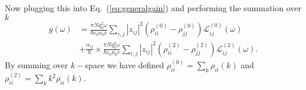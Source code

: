 \documentclass[preprint,secnumarabic,amssymb, nobibnotes, aip, prd]{revtex4-1}
\begin{document}
Now plugging this into Eq.~(\ref{eq:generalgain}) and performing the summation over $k$
\begin{align}
g(\omega) &= \frac{\pi Nq_0^2\omega}{\hbar\epsilon_0n_0c}\sum_{i,j}|z_{ij}|^2(\rho_{ii}^{(0)}-\rho_{jj}^{(0)})\mathcal{L}_{ij}^{(0)}(\omega) \nonumber \\
&+\frac{\alpha_{ij}}{\hbar}\times\frac{\pi Nq_0^2\omega}{\hbar\epsilon_0n_0c}\sum_{i,j}|z_{ij}|^2(\rho_{ii}^{(2)}-\rho_{jj}^{(2)})\mathcal{L}_{ij}^{(2)}(\omega).
\end{align}
By summing over $k-$space we have defined $\rho_{ii}^{(0)} = \sum_{k}\rho_{ii}(k)$ and $\rho_{ii}^{(2)} = \sum_{k}k^2\rho_{ii}(k)$.



\end{document}
